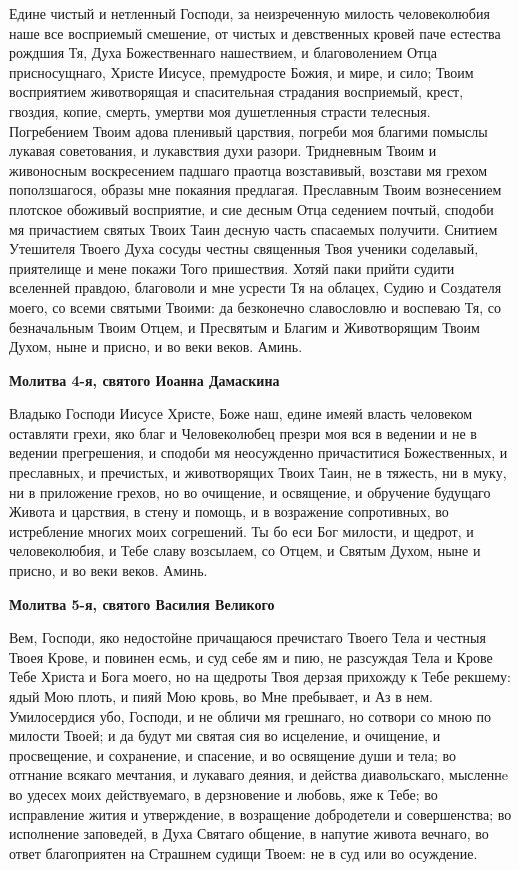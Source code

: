 Едине чистый и нетленный Господи, за неизреченную милость человеколюбия наше все восприемый смешение, от чистых и девственных кровей паче естества рождшия Тя, Духа Божественнаго нашествием, и благоволением Отца присносущнаго, Христе Иисусе, премудросте Божия, и мире, и сило; Твоим восприятием животворящая и спасительная страдания восприемый, крест, гвоздия, копие, смерть, умертви моя душетленныя страсти телесныя. Погребением Твоим адова пленивый царствия, погреби моя благими помыслы лукавая советования, и лукавствия духи разори. Тридневным Твоим и живоносным воскресением падшаго праотца возставивый, возстави мя грехом поползшагося, образы мне покаяния предлагая. Преславным Твоим вознесением плотское обоживый восприятие, и сие десным Отца седением почтый, сподоби мя причастием святых Твоих Таин десную часть спасаемых получити. Снитием Утешителя Твоего Духа сосуды честны священныя Твоя ученики соделавый, приятелище и мене покажи Того пришествия. Хотяй паки прийти судити вселенней правдою, благоволи и мне усрести Тя на облацех, Судию и Создателя моего, со всеми святыми Твоими: да безконечно славословлю и воспеваю Тя, со безначальным Твоим Отцем, и Пресвятым и Благим и Животворящим Твоим Духом, ныне и присно, и во веки веков. Аминь.


\medskip
\bfseries Молитва 4-я, святого Иоанна Дамаскина\normalfont{}\nopagebreak


Владыко Господи Иисусе Христе, Боже наш, едине имеяй власть человеком оставляти грехи, яко благ и Человеколюбец презри моя вся в ведении и не в ведении прегрешения, и сподоби мя неосужденно причаститися Божественных, и преславных, и пречистых, и животворящих Твоих Таин, не в тяжесть, ни в муку, ни в приложение грехов, но во очищение, и освящение, и обручение будущаго Живота и царствия, в стену и помощь, и в возражение сопротивных, во истребление многих моих согрешений. Ты бо еси Бог милости, и щедрот, и человеколюбия, и Тебе славу возсылаем, со Отцем, и Святым Духом, ныне и присно, и во веки веков. Аминь.


\medskip
\bfseries Молитва 5-я, святого Василия Великого\normalfont{}\nopagebreak


Вем, Господи, яко недостойне причащаюся пречистаго Твоего Тела и честныя Твоея Крове, и повинен есмь, и суд себе ям и пию, не разсуждая Тела и Крове Тебе Христа и Бога моего, но на щедроты Твоя дерзая прихожду к Тебе рекшему: ядый Мою плоть, и пияй Мою кровь, во Мне пребывает, и Аз в нем. Умилосердися убо, Господи, и не обличи мя грешнаго, но сотвори со мною по милости Твоей; и да будут ми святая сия во исцеление, и очищение, и просвещение, и сохранение, и спасение, и во освящение души и тела; во отгнание всякаго мечтания, и лукаваго деяния, и действа диавольскаго, мысленнe во удесех моих действуемаго, в дерзновение и любовь, яже к Тебе; во исправление жития и утверждение, в возращение добродетели и совершенства; во исполнение заповедей, в Духа Святаго общение, в напутие живота вечнаго, во ответ благоприятен на Страшнем судищи Твоем: не в суд или во осуждение.


